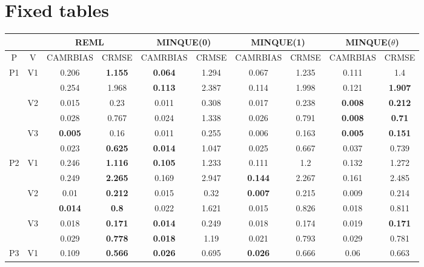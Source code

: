 \documentclass[12pt,a4paper]{article}
\begin{document}
\section{Fixed tables}

\begin{sidewaystable}[ht]
\centering
{\footnotesize
\begin{tabular}{cc|cc|cc|cc|cc|}
   & & \multicolumn{2}{c|}{REML}&\multicolumn{2}{c|}{MINQUE(0)}&\multicolumn{2}{c|}{MINQUE(1)}&\multicolumn{2}{c|}{MINQUE($\theta$)}\\ \hline
P & V & CAMRBIAS & CRMSE & CAMRBIAS & CRMSE & CAMRBIAS & CRMSE & CAMRBIAS & CRMSE \\ 
  \hline
\multirow{6}{*}{P1} & \multirow{2}{*}{V1} & 0.206 & \textbf{1.155} & \textbf{0.064} & 1.294 & 0.067 & 1.235 & 0.111 & 1.4 \\ 
   &  & 0.254 & 1.968 & \textbf{0.113} & 2.387 & 0.114 & 1.998 & 0.121 & \textbf{1.907} \\ 
   & \multirow{2}{*}{V2} & 0.015 & 0.23 & 0.011 & 0.308 & 0.017 & 0.238 & \textbf{0.008} & \textbf{0.212} \\ 
   &  & 0.028 & 0.767 & 0.024 & 1.338 & 0.026 & 0.791 & \textbf{0.008} & \textbf{0.71} \\ 
   & \multirow{2}{*}{V3} & \textbf{0.005} & 0.16 & 0.011 & 0.255 & 0.006 & 0.163 & \textbf{0.005} & \textbf{0.151} \\ 
   &  & 0.023 & \textbf{0.625} & \textbf{0.014} & 1.047 & 0.025 & 0.667 & 0.037 & 0.739 \\ 
   \hline \hline\multirow{6}{*}{P2} & \multirow{2}{*}{V1} & 0.246 & \textbf{1.116} & \textbf{0.105} & 1.233 & 0.111 & 1.2 & 0.132 & 1.272 \\ 
   &  & 0.249 & \textbf{2.265} & 0.169 & 2.947 & \textbf{0.144} & 2.267 & 0.161 & 2.485 \\ 
   & \multirow{2}{*}{V2} & 0.01 & \textbf{0.212} & 0.015 & 0.32 & \textbf{0.007} & 0.215 & 0.009 & 0.214 \\ 
   &  & \textbf{0.014} & \textbf{0.8} & 0.022 & 1.621 & 0.015 & 0.826 & 0.018 & 0.811 \\ 
   & \multirow{2}{*}{V3} & 0.018 & \textbf{0.171} & \textbf{0.014} & 0.249 & 0.018 & 0.174 & 0.019 & \textbf{0.171} \\ 
   &  & 0.029 & \textbf{0.778} & \textbf{0.018} & 1.19 & 0.021 & 0.793 & 0.029 & 0.781 \\ 
   \hline \hline\multirow{6}{*}{P3} & \multirow{2}{*}{V1} & 0.109 & \textbf{0.566} & \textbf{0.026} & 0.695 & \textbf{0.026} & 0.666 & 0.06 & 0.663 \\ 

\end{tabular}}
\end{sidewaystable}
\end{document}
